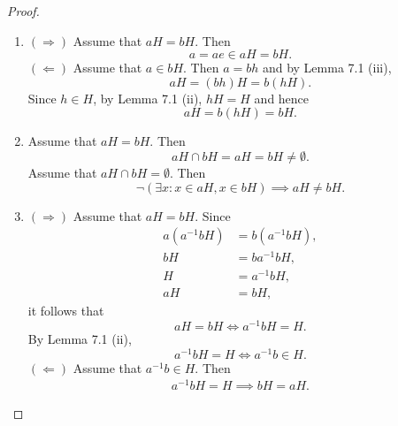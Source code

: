 \documentclass{article}
\theoremstyle{definition}
\begin{document}
\begin{proof}
\begin{enumerate}[label=(\roman*)]
             \item $(\Rightarrow)$ Assume that $aH=bH$. Then
             \begin{equation*}
                 a = ae \in aH = bH.
             \end{equation*}
             $(\Leftarrow)$ Assume that $a \in bH$. Then $a = bh$ and by Lemma 7.1 (iii),
             \begin{equation*}
                 aH = (bh)H = b(hH).
             \end{equation*}
             Since $h \in H$, by Lemma 7.1 (ii), $hH = H$ and hence
             \begin{equation*}
                 aH = b(hH) = bH.
             \end{equation*}
             
             \item Assume that $aH = bH$. Then 
             \begin{equation*}
                 aH \cap bH = aH = bH \neq \emptyset.
             \end{equation*}
             Assume that $aH \cap bH = \emptyset$. Then
             \begin{equation*}
                 \neg (\exists x: x \in aH, x \in bH) \implies aH \neq bH.
             \end{equation*}
             
             \item $(\Rightarrow)$ Assume that $aH=bH$. Since
             \begin{align*}
                 a(a^{-1}bH) &= b(a^{-1}bH), \\
                 bH &= ba^{-1}bH, \\
                 H &= a^{-1}bH, \\
                 aH &= bH,
             \end{align*}
             it follows that
             \begin{equation*}
                 aH = bH \iff a^{-1}bH = H.
             \end{equation*}
             By Lemma 7.1 (ii),
             \begin{equation*}
                 a^{-1}bH = H \iff a^{-1}b \in H.
             \end{equation*}
             $(\Leftarrow)$ Assume that $a^{-1}b \in H$. Then
             \begin{align*}
                 a^{-1}bH = H \implies bH = aH.
             \end{align*}
             

\end{enumerate}
\end{proof}
\end{document}
